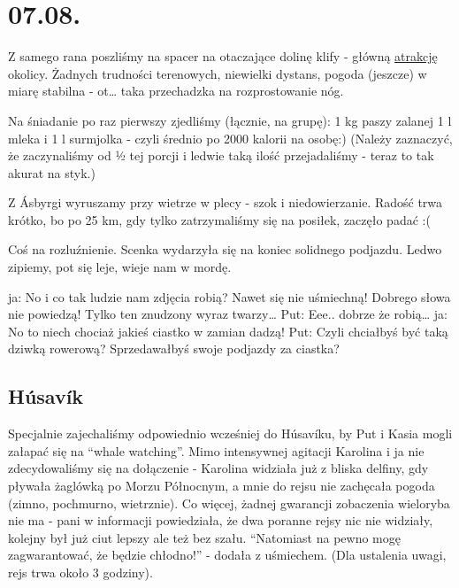 \chapter{07.08.}

Z samego rana poszliśmy na spacer na otaczające dolinę klify - główną \href{http://www.visithusavik.com/attractions/asbyrgi-canyon/}{atrakcję} okolicy. Żadnych trudności terenowych, niewielki dystans, pogoda (jeszcze) w miarę stabilna - ot… taka przechadzka na rozprostowanie nóg.

Na śniadanie po raz pierwszy zjedliśmy (łącznie, na grupę): 1 kg paszy zalanej 1 l mleka i 1 l surmjolka - czyli średnio po 2000 kalorii na osobę:) (Należy zaznaczyć, że zaczynaliśmy od ½ tej porcji i ledwie taką ilość przejadaliśmy - teraz to tak akurat na styk.)


Z Ásbyrgi wyruszamy przy wietrze w plecy - szok i niedowierzanie. Radość trwa krótko, bo po 25 km, gdy tylko zatrzymaliśmy się na posiłek, zaczęło padać :(

Coś na rozluźnienie. Scenka wydarzyła się na koniec solidnego podjazdu. Ledwo zipiemy, pot się leje, wieje nam w mordę.

ja: No i co tak ludzie nam zdjęcia robią? Nawet się nie uśmiechną! Dobrego słowa nie powiedzą! Tylko ten znudzony wyraz twarzy…
Put: Eee.. dobrze że robią…
ja: No to niech chociaż jakieś ciastko w zamian dadzą!
Put: Czyli chciałbyś być taką dziwką rowerową? Sprzedawałbyś swoje podjazdy za ciastka?

\section{Húsavík}

Specjalnie zajechaliśmy odpowiednio wcześniej do Húsavíku, by Put i Kasia mogli załapać się na “whale watching”. Mimo intensywnej agitacji Karolina i ja nie zdecydowaliśmy się na dołączenie - Karolina widziała już z bliska delfiny, gdy pływała żaglówką po Morzu Północnym, a mnie do rejsu nie zachęcała pogoda (zimno, pochmurno, wietrznie). Co więcej, żadnej gwarancji zobaczenia wieloryba nie ma - pani w informacji powiedziała, że dwa poranne rejsy nic nie widziały, kolejny był już ciut lepszy ale też bez szału. “Natomiast na pewno mogę zagwarantować, że będzie chłodno!” - dodała z uśmiechem. (Dla ustalenia uwagi, rejs trwa około 3 godziny).

